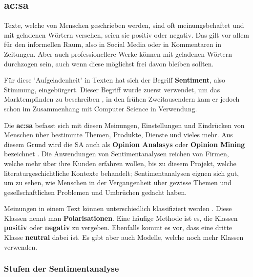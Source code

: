 \subsection{\acrfull{ac:sa}} \label{sec:sentiment-analasys}

Texte, welche von Menschen geschrieben werden, sind oft meinungsbehaftet und mit geladenen Wörtern versehen, seien sie positiv oder negativ. Das gilt vor allem für den informellen Raum, also in Social Media oder in Kommentaren in Zeitungen. Aber auch professionellere Werke können mit geladenen Wörtern durchzogen sein, auch wenn diese möglichst frei davon bleiben sollten.

Für diese 'Aufgeladenheit' in Texten hat sich der Begriff \textbf{Sentiment}, also Stimmung, eingebürgert. Dieser Begriff wurde zuerst verwendet, um das Marktempfinden zu beschreiben \cite[21567-21568]{amjad2023sentiment}, in den frühen Zweitausendern kam er jedoch schon im Zusammenhang mit Computer Science in Verwendung.

Die \textbf{\acrfull{ac:sa}} \cite[5731]{Wankhade2022sentiment} befasst sich mit diesen Meinungen, Einstellungen und Eindrücken von Menschen über bestimmte Themen, Produkte, Dienste und vieles mehr. Aus diesem Grund wird die SA auch als \textbf{Opinion Analasys} oder \textbf{Opinion Mining} bezeichnet \cite[5732]{Wankhade2022sentiment}. Die Anwendungen von Sentimentanalysen reichen von Firmen, welche mehr über ihre Kunden erfahren wollen, bis zu diesem Projekt, welche literaturgeschichtliche Kontexte behandelt; Sentimentanalysen eignen sich gut, um zu sehen, wie Menschen in der Vergangenheit über gewisse Themen und gesellschaftlichen Problemen und Umbrüchen gedacht haben.

Meinungen in einem Text können unterschiedlich klassifiziert werden \cite[21568]{amjad2023sentiment}. Diese Klassen nennt man \textbf{Polarisationen}. Eine häufige Methode ist es, die Klassen \textbf{positiv} oder \textbf{negativ} zu vergeben. Ebenfalls kommt es vor, dass eine dritte Klasse \textbf{neutral} dabei ist. Es gibt aber auch Modelle, welche noch mehr Klassen verwenden.

\subsubsection{Stufen der Sentimentanalyse}


